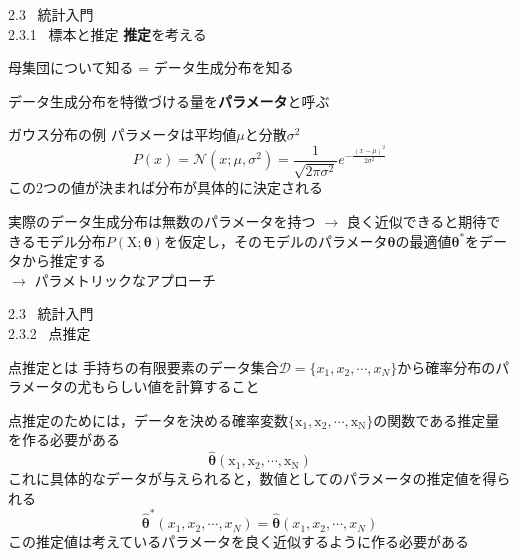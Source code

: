 \documentclass[dvipdfmx,10pt]{beamer}
\begin{document}
  \begin{frame}[t]{2.3 \ 統計入門 \\ \normalsize{2.3.1 \ 標本と推定}}
    \textbf{推定}を考える\\
    \begin{center}
      母集団について知る = データ生成分布を知る
    \end{center}
    データ生成分布を特徴づける量を\textbf{パラメータ}と呼ぶ
    \begin{exampleblock}{ガウス分布の例}
      パラメータは平均値$\mu$と分散$\sigma^2$
      \begin{equation*}
        P(x)=\mathcal{N}(x;\mu,\sigma^2)=\frac{1}{\sqrt{2\pi \sigma^2}}e^{-\frac{(x-\mu)^2}{2\sigma^2}}
      \end{equation*}
      この2つの値が決まれば分布が具体的に決定される
    \end{exampleblock}
    実際のデータ生成分布は無数のパラメータを持つ
    $\rightarrow$ 良く近似できると期待できるモデル分布$P(\mathrm{X};\bm{\theta})$を仮定し，そのモデルのパラメータ$\bm{\theta}$の最適値$\bm{\theta}^*$をデータから推定する\\
    $\rightarrow$ パラメトリックなアプローチ
  \end{frame}

  \begin{frame}[t]{2.3 \ 統計入門 \\ \normalsize{2.3.2 \ 点推定}}
    \begin{block}{点推定とは}
      手持ちの有限要素のデータ集合$\mathcal{D}=\{x_1,x_2,\cdots,x_N\}$から確率分布のパラメータの尤もらしい値を計算すること
    \end{block}
    点推定のためには，データを決める確率変数$\{\mathrm{x_1},\mathrm{x_2},\cdots,\mathrm{x_N}\}$の関数である推定量を作る必要がある
    \begin{equation*}
      \hat{\bm{\theta}}(\mathrm{x_1},\mathrm{x_2},\cdots,\mathrm{x_N})
    \end{equation*}
    これに具体的なデータが与えられると，数値としてのパラメータの推定値を得られる
    \begin{equation*}
      \hat{\bm{\theta}}^*(x_1,x_2,\cdots,x_N) = \hat{\bm{\theta}}(x_1,x_2,\cdots,x_N)
    \end{equation*}
    この推定値は考えているパラメータを良く近似するように作る必要がある
  \end{frame}
\end{document}

